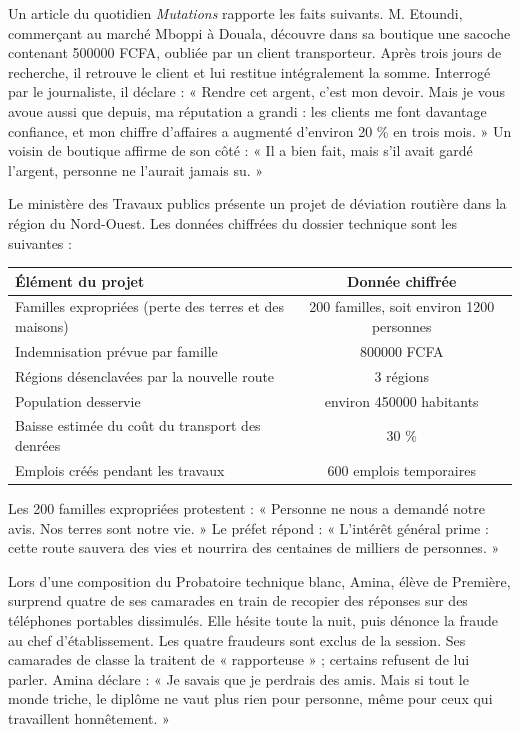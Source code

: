 \documentclass[11pt]{article}
\begin{document}
\begin{exemplebox}
Un article du quotidien \emph{Mutations} rapporte les faits suivants. M. Etoundi, commerçant au marché Mboppi à Douala, découvre dans sa boutique une sacoche contenant \num{500000} FCFA, oubliée par un client transporteur. Après trois jours de recherche, il retrouve le client et lui restitue intégralement la somme. Interrogé par le journaliste, il déclare : « Rendre cet argent, c'est mon devoir. Mais je vous avoue aussi que depuis, ma réputation a grandi : les clients me font davantage confiance, et mon chiffre d'affaires a augmenté d'environ 20 \% en trois mois. » Un voisin de boutique affirme de son côté : « Il a bien fait, mais s'il avait gardé l'argent, personne ne l'aurait jamais su. »
\end{exemplebox}

\begin{exemplebox}
Le ministère des Travaux publics présente un projet de déviation routière dans la région du Nord-Ouest. Les données chiffrées du dossier technique sont les suivantes :
\begin{center}
\begin{tabularx}{\linewidth}{|X|c|}
\hline
\rowcolor{popblueL} \textbf{Élément du projet} & \textbf{Donnée chiffrée} \\
\hline
Familles expropriées (perte des terres et des maisons) & 200 familles, soit environ \num{1200} personnes \\
\hline
Indemnisation prévue par famille & \num{800000} FCFA \\
\hline
Régions désenclavées par la nouvelle route & 3 régions \\
\hline
Population desservie & environ \num{450000} habitants \\
\hline
Baisse estimée du coût du transport des denrées & 30 \% \\
\hline
Emplois créés pendant les travaux & 600 emplois temporaires \\
\hline
\end{tabularx}
\end{center}
Les 200 familles expropriées protestent : « Personne ne nous a demandé notre avis. Nos terres sont notre vie. » Le préfet répond : « L'intérêt général prime : cette route sauvera des vies et nourrira des centaines de milliers de personnes. »
\end{exemplebox}

\begin{exemplebox}
Lors d'une composition du Probatoire technique blanc, Amina, élève de Première, surprend quatre de ses camarades en train de recopier des réponses sur des téléphones portables dissimulés. Elle hésite toute la nuit, puis dénonce la fraude au chef d'établissement. Les quatre fraudeurs sont exclus de la session. Ses camarades de classe la traitent de « rapporteuse » ; certains refusent de lui parler. Amina déclare : « Je savais que je perdrais des amis. Mais si tout le monde triche, le diplôme ne vaut plus rien pour personne, même pour ceux qui travaillent honnêtement. »
\end{exemplebox}
\end{document}
